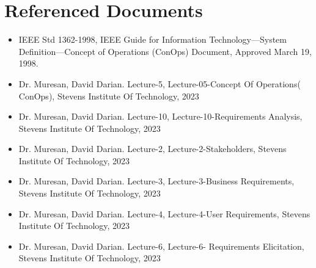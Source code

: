 \chapter{Referenced Documents \\
\label{Chapter::References}}

\begin{itemize}
    \item IEEE Std 1362-1998, IEEE Guide for Information Technology—System Definition—Concept of Operations (ConOps) Document, Approved March 19, 1998.

    \item Dr. Muresan, David Darian. Lecture-5, Lecture-05-Concept Of Operations( ConOps), Stevens Institute Of Technology, 2023
    \item Dr. Muresan, David Darian. Lecture-10, Lecture-10-Requirements Analysis, Stevens Institute Of Technology, 2023
    \item Dr. Muresan, David Darian. Lecture-2, Lecture-2-Stakeholders, Stevens Institute Of Technology, 2023
    \item Dr. Muresan, David Darian. Lecture-3, Lecture-3-Business Requirements, Stevens Institute Of Technology, 2023
    \item Dr. Muresan, David Darian. Lecture-4, Lecture-4-User Requirements, Stevens Institute Of Technology, 2023
    \item Dr. Muresan, David Darian. Lecture-6, Lecture-6- Requirements Elicitation, Stevens Institute Of Technology, 2023
    

    
\end{itemize}